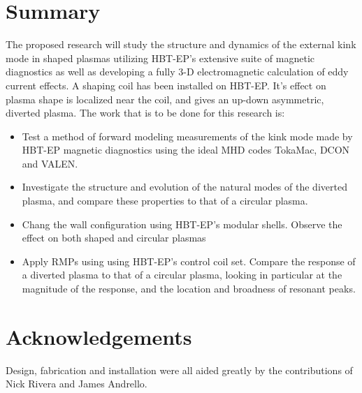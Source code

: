 \documentclass[aps,preprint,showpacs,superscriptaddress,groupedaddress]{revtex4}  %
\begin{document}
\section{Summary}
The proposed research will study the structure and dynamics of the external kink mode in shaped plasmas utilizing HBT-EP's extensive suite of magnetic diagnostics as well as developing a fully 3-D electromagnetic calculation of eddy current effects.  A shaping coil has been installed on HBT-EP.  It's effect on plasma shape is localized near the coil, and gives an up-down asymmetric, diverted plasma.  The work that is to be done for this research is:
\begin{itemize}
\item Test a method of forward modeling measurements of the kink mode made by HBT-EP magnetic diagnostics using the ideal MHD codes TokaMac, DCON and VALEN.
\item Investigate the structure and evolution of the natural modes of the diverted plasma, and compare these properties to that of a circular plasma.
\item Chang the wall configuration using HBT-EP's modular shells.  Observe the effect on both shaped and circular plasmas
\item Apply RMPs using using HBT-EP's control coil set.  Compare the response of a diverted plasma to that of a circular plasma, looking in particular at the magnitude of the response, and the location and broadness of resonant peaks.
\end{itemize}

\newpage
\section{Acknowledgements}
Design, fabrication and installation were all aided greatly by the contributions of Nick Rivera and James Andrello.
\end{document}
